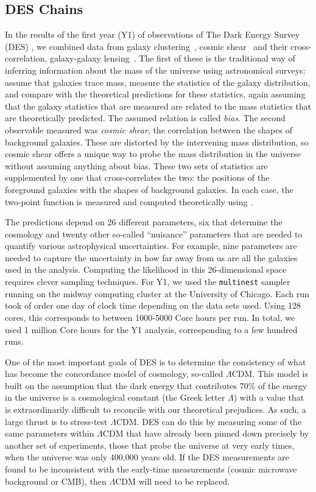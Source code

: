\documentclass[12pt]{article}
\begin{document}
\begin{small}
\subsection{DES Chains}

In the results of the first year (Y1) of observations of The Dark Energy Survey (DES) \cite{Abbott:2017wau}, we combined data from galaxy clustering~\cite{Elvin-Poole:2017xsf}, cosmic shear~\cite{Troxel:2017xyo} and their cross-correlation, galaxy-galaxy lensing~\cite{Prat:2017goa}. The first of these is the traditional way of inferring information about the mass of the universe using astronomical surveys: assume that galaxies trace mass, measure the statistics of the galaxy distribution, and compare with the theoretical predictions for these statistics, again assuming that the galaxy statistics that are measured are related to the mass statistics that are theoretically predicted. The assumed relation is called \emph{bias}. The second observable measured was \emph{cosmic shear}, the correlation between the shapes of background galaxies. These are distorted by the intervening mass distribution, so cosmic shear offers a unique way to probe the mass distribution in the universe without assuming anything about bias. These two sets of statistics are supplemented by one that cross-correlates the two: the positions of the foreground galaxies with the shapes of background galaxies. In each case, the two-point function is measured and computed theoretically using \cosmosis. 

The predictions depend on 26 different parameters, six that determine the cosmology and twenty other so-called ``nuisance'' parameters that are needed to quantify various astrophysical uncertainties. For example, nine parameters are needed to capture the uncertainty in how far away from us are all the galaxies used in the analysis. Computing the likelihood in this 26-dimensional space requires clever sampling techniques. For Y1, we used the {\tt multinest} sampler~\cite{Feroz:2008xx} running on the midway computing cluster at the University of Chicago. Each run took of order one day of clock time depending on the data sets used. Using 128 cores, this corresponds to between 1000-5000 Core hours per run. In total, we used 1 million Core hours for the Y1 analysis, corresponding to a few hundred runs. 

One of the most important goals of DES is to determine the consistency of what has become the concordance model of cosmology, so-called $\Lambda$CDM. This model is built on the assumption that the dark energy that contributes 70\% of the energy in the universe is a cosmological constant (the Greek letter $\Lambda$) with a value that is extraordinarily difficult to reconcile with our theoretical prejudices. As such, a large thrust is to stress-test $\Lambda$CDM. DES can do this by measuring some of the same parameters within $\Lambda$CDM that have already been pinned down precisely by another set of experiments, those that probe the universe at very early times, when the universe was only 400,000 years old. If the DES measurements are found to be inconsistent with the early-time measurements (cosmic microwave background or CMB), then $\Lambda$CDM will need to be replaced.


\end{small}
\end{document}
